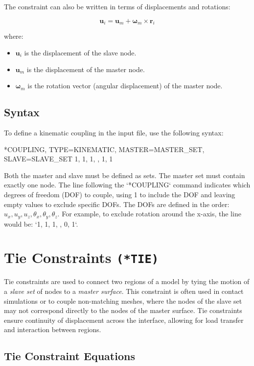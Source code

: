 The constraint can also be written in terms of displacements and rotations:

\[
\mathbf{u}_i = \mathbf{u}_m + \boldsymbol{\omega}_m \times \mathbf{r}_i
\]

where:
\begin{itemize}
    \item \( \mathbf{u}_i \) is the displacement of the slave node.
    \item \( \mathbf{u}_m \) is the displacement of the master node.
    \item \( \boldsymbol{\omega}_m \) is the rotation vector (angular displacement) of the master node.
\end{itemize}

\subsection{Syntax}

To define a kinematic coupling in the input file, use the following syntax:

\begin{codeBlock}
*COUPLING, TYPE=KINEMATIC, MASTER=MASTER_SET, SLAVE=SLAVE_SET
1, 1, 1, , 1, 1
\end{codeBlock}

Both the master and slave must be defined as sets. The master set must contain exactly one node. The line following the `*COUPLING` command indicates which degrees of freedom (DOF) to couple, using 1 to include the DOF and leaving empty values to exclude specific DOFs. The DOFs are defined in the order: \( u_x, u_y, u_z, \theta_x, \theta_y, \theta_z \).
For example, to exclude rotation around the x-axis, the line would be: `1, 1, 1, , 0, 1`.

\section{Tie Constraints \texttt{(*TIE)}}

Tie constraints are used to connect two regions of a model by tying the motion of a \textit{slave set} of nodes to a \textit{master surface}. This constraint is often used in contact simulations or to couple non-matching meshes, where the nodes of the slave set may not correspond directly to the nodes of the master surface. Tie constraints ensure continuity of displacement across the interface, allowing for load transfer and interaction between regions.

\subsection{Tie Constraint Equations}

